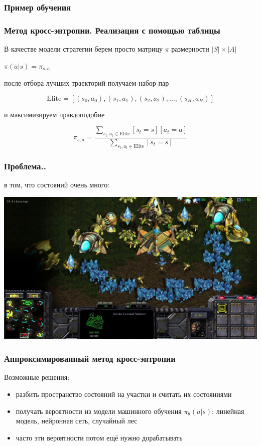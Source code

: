 \documentclass[fullscreen=true, bookmarks=true, hyperref={pdfencoding=unicode}]{beamer}
\begin{document}
\begin{frame}
  \frametitle{Пример обучения}

  \begin{center}
  \end{center}
\end{frame}


\begin{frame}
  \frametitle{Метод кросс-энтропии. Реализация с помощью таблицы}

  В качестве модели стратегии берем просто матрицу $\pi$ размерности $| S | \times | A |$

  $\pi(a | s) = \pi_{s,a}$

  после отбора лучших траекторий получаем набор пар

  $$\text{Elite} = [(s_0, a_0), (s_1, a_1), (s_2, a_2), \dots, (s_H, a_H )]$$

  и максимизируем правдоподобие

  $$ \pi_{s,a} = \frac{\sum\limits_{s_t, a_t \in \text{Elite}} [s_t = s][a_t = a]}{\sum\limits_{s_t, a_t \in \text{Elite}} [s_t = s]}$$

\end{frame}


\begin{frame}
  \frametitle{Проблема..}

  в том, что состояний очень много:

  \begin{center}
    \includegraphics[keepaspectratio,
                     width=.85\paperwidth]{starcraft3.jpg}
  \end{center}
\end{frame}


\begin{frame}
  \frametitle{Аппроксимированный метод кросс-энтропии}

  Возможные решения:
  \begin{itemize}
    \item разбить пространство состояний на участки и считать их состояниями
    \pause
    \item получать вероятности из модели машинного обучения $\pi_\theta (a | s)$: линейная модель, нейронная сеть, случайный лес
    \item часто эти вероятности потом ещё нужно дорабатывать
  \end{itemize}
\end{frame}
\end{document}

